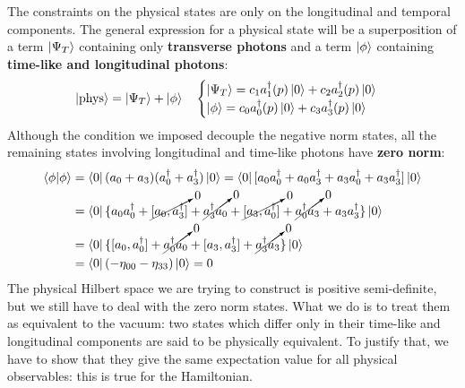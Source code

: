 \documentclass[../main.tex]{subfiles}
\begin{document}
The constraints on the physical states are only on the longitudinal and temporal components. The general expression for a physical state will be a superposition of a term $\ket{\Psi_T}$ containing only \textbf{transverse photons} and a term $\ket{\phi}$ containing \textbf{time-like and longitudinal photons}:
\[
\ket{\text{phys}}=\ket{\Psi_T}+\ket{\phi} \quad \begin{cases}
\ket{\Psi_T}=c_1a^\dagger_1(p)\ket{0}+c_2a^\dagger_2(p)\ket{0}\\
\ket{\phi}=c_0a^\dagger_0(p)\ket{0}+c_3a^\dagger_3(p)\ket{0}
\end{cases}
\]
Although the condition we imposed decouple the negative norm states, all the remaining states involving longitudinal and time-like photons have \textbf{zero norm}:
\begin{align*}
\bra{\phi}\ket{\phi}&=\bra{0}(a_0+a_3)(a^\dagger_0+a^\dagger_3)\ket{0}=\bra{0}[a_0a^\dagger_0+a_0a^\dagger_3+a_3a^\dagger_0+a_3a^\dagger_3]\ket{0}\\
&=\bra{0}\{a_0a^\dagger_0+\cancelto{0}{[a_0,a^\dagger_3]}+\cancelto{0}{a^\dagger_3a_0}+\cancelto{0}{[a_3,a^\dagger_0]}+\cancelto{0}{a^\dagger_0a_3}+a_3a^\dagger_3\}\ket{0}\\
&=\bra{0}\{[a_0,a^\dagger_0]+\cancelto{0}{a^\dagger_0 a_0}+[a_3,a^\dagger_3]+\cancelto{0}{a^\dagger_3 a_3}\}\ket{0}\\
&=\bra{0}(-\eta_{00}-\eta_{33})\ket{0}=0 
\end{align*}
The physical Hilbert space we are trying to construct is positive semi-definite, but we still have to deal with the zero norm states. What we do is to treat them as equivalent to the vacuum: two states which differ only in their time-like and longitudinal components are said to be physically equivalent. To justify that, we have to show that they give the same expectation value for all physical observables: this is true for the Hamiltonian.
\end{document}
